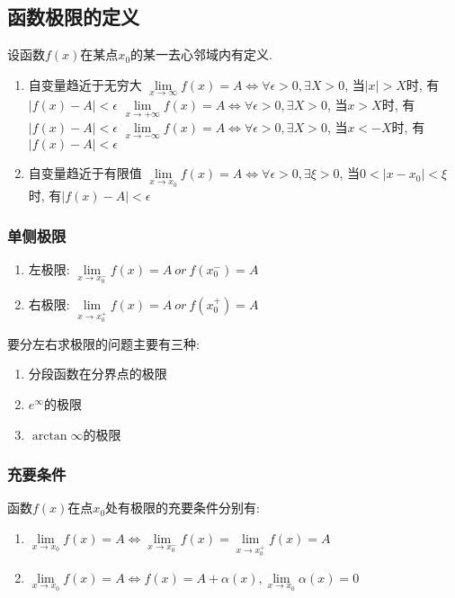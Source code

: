 \subsection{函数极限的定义}
设函数$ f(x) $在某点$ x_{0} $的某一去心邻域内有定义.
\begin{enumerate}
\item 自变量趋近于无穷大
\subitem $ \lim\limits_{x\rightarrow \infty}f(x)=A\Leftrightarrow \forall \epsilon >0, \exists X>0 $, 当$ |x|>X $时, 有$ |f(x)-A|<\epsilon $
\subitem $ \lim\limits_{x\rightarrow +\infty}f(x)=A\Leftrightarrow \forall \epsilon >0, \exists X>0 $, 当$ x>X $时, 有$ |f(x)-A|<\epsilon $
\subitem $ \lim\limits_{x\rightarrow -\infty}f(x)=A\Leftrightarrow \forall \epsilon >0, \exists X>0 $, 当$ x<-X $时, 有$ |f(x)-A|<\epsilon $
\item 自变量趋近于有限值
\subitem $ \lim\limits_{x\rightarrow x_{0}}f(x)=A\Leftrightarrow \forall \epsilon >0, \exists \xi>0 $, 当$ 0<|x-x_{0}|<\xi $时, 有$ |f(x)-A|<\epsilon $
\end{enumerate}
\subsubsection{单侧极限}
\begin{enumerate}
\item 左极限: $ \lim\limits_{x\rightarrow x_{0}^{-}}f(x)=A\ or\ f(x_{0}^{-})=A $
\item 右极限: $ \lim\limits_{x\rightarrow x_{0}^{+}}f(x)=A\ or\ f(x_{0}^{+})=A $
\end{enumerate}
\begin{tcolorbox}
要分左右求极限的问题主要有三种:
\begin{enumerate}
\item 分段函数在分界点的极限
\item $ e^{\infty} $的极限
\item $ \arctan \infty $的极限
\end{enumerate}
\end{tcolorbox}
\subsubsection{充要条件}
函数$ f(x) $在点$ x_{0} $处有极限的充要条件分别有:
\begin{enumerate}
\item $ \lim\limits_{x\rightarrow x_{0}}f(x)=A\Leftrightarrow \lim\limits_{x\rightarrow x_{0}^{-}}f(x)=\lim\limits_{x\rightarrow x_{0}^{+}}f(x)=A $
\item $ \lim\limits_{x\rightarrow x_{0}}f(x)=A\Leftrightarrow f(x)=A+\alpha(x), \lim\limits_{x\rightarrow x_{0}}\alpha(x)=0 $
\end{enumerate}
